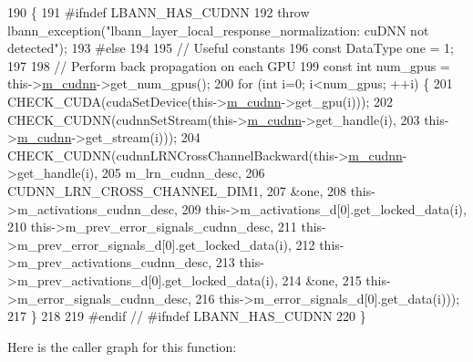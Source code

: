 \begin{DoxyCode}
190                           \{
191 \textcolor{preprocessor}{  #ifndef LBANN\_HAS\_CUDNN}
192     \textcolor{keywordflow}{throw} lbann\_exception(\textcolor{stringliteral}{"lbann\_layer\_local\_response\_normalization: cuDNN not detected"});
193 \textcolor{preprocessor}{  #else}
194 
195     \textcolor{comment}{// Useful constants}
196     \textcolor{keyword}{const} DataType one = 1;
197 
198     \textcolor{comment}{// Perform back propagation on each GPU}
199     \textcolor{keyword}{const} \textcolor{keywordtype}{int} num\_gpus = this->\hyperlink{classlbann_1_1Layer_a08dbb94239e3b8c96329786c57c72e21}{m\_cudnn}->get\_num\_gpus();
200     \textcolor{keywordflow}{for} (\textcolor{keywordtype}{int} i=0; i<num\_gpus; ++i) \{
201       CHECK\_CUDA(cudaSetDevice(this->\hyperlink{classlbann_1_1Layer_a08dbb94239e3b8c96329786c57c72e21}{m\_cudnn}->get\_gpu(i)));
202       CHECK\_CUDNN(cudnnSetStream(this->\hyperlink{classlbann_1_1Layer_a08dbb94239e3b8c96329786c57c72e21}{m\_cudnn}->get\_handle(i),
203                                  this->\hyperlink{classlbann_1_1Layer_a08dbb94239e3b8c96329786c57c72e21}{m\_cudnn}->get\_stream(i)));
204       CHECK\_CUDNN(cudnnLRNCrossChannelBackward(this->\hyperlink{classlbann_1_1Layer_a08dbb94239e3b8c96329786c57c72e21}{m\_cudnn}->get\_handle(i),
205                                                m\_lrn\_cudnn\_desc,
206                                                CUDNN\_LRN\_CROSS\_CHANNEL\_DIM1,
207                                                &one,
208                                                this->m\_activations\_cudnn\_desc,
209                                                this->m\_activations\_d[0].get\_locked\_data(i),
210                                                this->m\_prev\_error\_signals\_cudnn\_desc,
211                                                this->m\_prev\_error\_signals\_d[0].get\_locked\_data(i),
212                                                this->m\_prev\_activations\_cudnn\_desc,
213                                                this->m\_prev\_activations\_d[0].get\_locked\_data(i),
214                                                &one,
215                                                this->m\_error\_signals\_cudnn\_desc,
216                                                this->m\_error\_signals\_d[0].get\_data(i)));
217     \}
218 
219 \textcolor{preprocessor}{  #endif // #ifndef LBANN\_HAS\_CUDNN}
220   \}
\end{DoxyCode}
Here is the caller graph for this function\+:\nopagebreak
